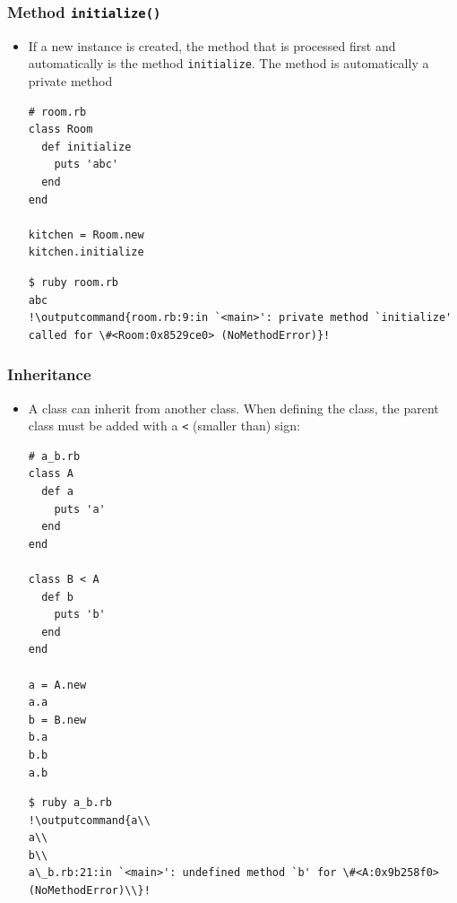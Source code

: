 \documentclass{beamer}
\newcommand{\outputcommand}[1]{\color{darkgreen}{#1}}
\begin{document}
\begin{frame}
\frametitle{Method \texttt{initialize()}}
\begin{itemize}
\item If a new instance is created, the method that is processed first and automatically is the method \texttt{initialize}.
The method is automatically a private method

\lstset{language=Ruby, style=eclipse}
\begin{lstlisting}[escapechar=&]
# room.rb
class Room
  def initialize
    puts 'abc'
  end
end

kitchen = Room.new
kitchen.initialize
\end{lstlisting}

\lstset{language=shell}
\begin{lstlisting}[numbers=none, escapechar=!]
$ ruby room.rb
abc
!\outputcommand{room.rb:9:in `<main>': private method `initialize' called for \#<Room:0x8529ce0> (NoMethodError)}!
\end{lstlisting}
\end{itemize}
\end{frame}
\begin{frame}
\frametitle{Inheritance}
\begin{itemize}
\item A class can inherit from another class. When defining the class, the parent class must be added with a \texttt{\textless} (smaller than) sign: 
\lstset{language=Ruby, style=eclipse}
\begin{lstlisting}[escapechar=&]
# a_b.rb
class A
  def a
    puts 'a'
  end
end

class B < A
  def b
    puts 'b'
  end
end

a = A.new
a.a
b = B.new
b.a
b.b
a.b
\end{lstlisting}

\lstset{language=shell}
\begin{lstlisting}[numbers=none, escapechar=!]
$ ruby a_b.rb
!\outputcommand{a\\
a\\
b\\
a\_b.rb:21:in `<main>': undefined method `b' for \#<A:0x9b258f0> (NoMethodError)\\}!
\end{lstlisting}
\end{itemize}
\end{frame}
\end{document}
